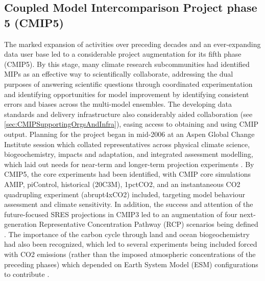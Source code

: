 \documentclass[gmd, preprint]{copernicus}
\begin{document}
\subsection{Coupled Model Intercomparison Project phase 5 (CMIP5)}
\label{sec:cmip5ProjectDesign}
The marked expansion of activities over preceding decades and an ever-expanding data user base led to a considerable project augmentation for its fifth phase (CMIP5). By this stage, many climate research subcommunities had identified MIPs as an effective way to scientifically collaborate, addressing the dual purposes of answering scientific questions through coordinated experimentation and identifying opportunities for model improvement by identifying consistent errors and biases across the multi-model ensembles. The developing data standards and delivery infrastructure also considerably aided collaboration (see \autoref{sec:CMIPSupportingOrgsAndInfra}), easing access to obtaining and using CMIP output. Planning for the project began in mid-2006 at an Aspen Global Change Institute session which collated representatives across physical climate science, biogeochemistry, impacts and adaptation, and integrated assessment modelling, which laid out needs for near-term and longer-term projection experiments \citep{meehl_introduction_2011}. By CMIP5, the core experiments had been identified, with CMIP core simulations AMIP, piControl, historical (20C3M), 1pctCO2, and an instantaneous CO2 quadrupling experiment (abrupt4xCO2) included, targeting model behaviour assessment and climate sensitivity. In addition, the success and attention of the future-focused SRES projections in CMIP3 led to an augmentation of four next-generation Representative Concentration Pathway (RCP) scenarios being defined \citep{moss_next_2010}. The importance of the carbon cycle through land and ocean biogeochemistry had also been recognized, which led to several experiments being included forced with CO2 emissions (rather than the imposed atmospheric concentrations of the preceding phases) which depended on Earth System Model (ESM) configurations to contribute \citep{hibbard_strategy_2007,meehl_introduction_2011}.
\end{document}
